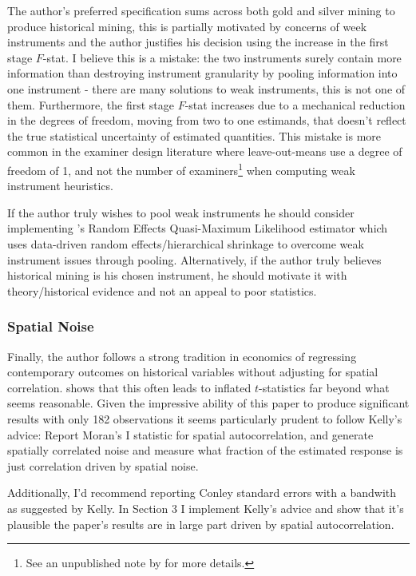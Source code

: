 \documentclass[12pt]{article}
\begin{document}
The author's preferred specification sums across both gold and silver mining to produce historical mining, this is partially motivated by concerns of week instruments and 
the author justifies his decision using the increase in the first stage $F$-stat. I believe this is a mistake: the two instruments surely contain more information than 
destroying instrument granularity  by pooling information into one instrument - there are many solutions to weak instruments, this is not one of them. Furthermore, the first stage $F$-stat increases due to a mechanical reduction in the degrees of freedom, moving from two to one estimands, that doesn't reflect the true statistical uncertainty of estimated quantities. This mistake is more common in the examiner design literature where leave-out-means use a degree of freedom of 1, and not the number of examiners\footnote{See an unpublished note by \cite{hull} for more details.} when computing weak instrument heuristics.


If the author truly wishes to pool weak instruments he should consider implementing \cite{reqml}'s Random Effects Quasi-Maximum Likelihood estimator which uses data-driven random effects/hierarchical shrinkage to overcome weak instrument issues through pooling. Alternatively, if the author truly believes historical mining 
is his chosen instrument, he should motivate it with theory/historical evidence and not an appeal to poor statistics.


\subsubsection*{Spatial Noise}


Finally, the author follows a strong tradition in economics of regressing contemporary outcomes on historical variables without adjusting for spatial correlation. \cite{persistence} shows that this often leads to inflated $t$-statistics far beyond what seems reasonable. Given the impressive ability of this paper to produce significant results 
with only 182 observations it seems particularly prudent to follow Kelly's advice: Report Moran's I statistic for spatial autocorrelation, and generate spatially correlated noise and measure what fraction of the estimated response is just correlation driven by spatial noise.



Additionally, I'd recommend reporting Conley standard errors with a bandwith as suggested by Kelly. In Section 3 I implement Kelly's advice and show that 
it's plausible the paper's results are in large part driven by spatial autocorrelation.
\end{document}
